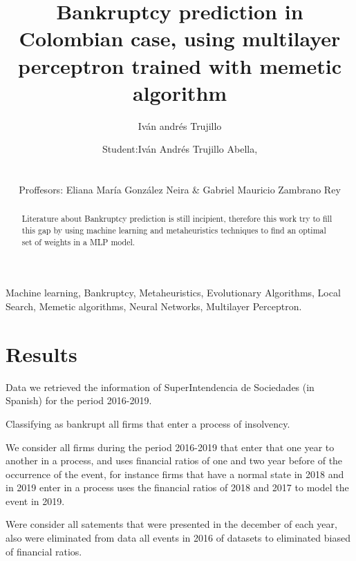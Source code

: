 \documentclass[journal]{IEEEtai}
\begin{document}
\title{Bankruptcy prediction in Colombian case, using multilayer perceptron trained with memetic algorithm} 


\author{ Iván andrés Trujillo }

\author{Student:Iván Andrés Trujillo Abella,\\

\\
\\

Proffesors: Eliana María González Neira \& Gabriel Mauricio Zambrano Rey}
\maketitle

\begin{abstract}
Literature about Bankruptcy prediction is still incipient, therefore this work try to fill this gap by using machine learning  and metaheuristics techniques to find an optimal set of  weights in a MLP model.
\end{abstract}


\begin{IEEEkeywords}
Machine learning, Bankruptcy, Metaheuristics, Evolutionary Algorithms, Local Search, Memetic algorithms, Neural Networks, Multilayer Perceptron.
\end{IEEEkeywords}





\section{Results}


Data we retrieved the information of SuperIntendencia de Sociedades (in Spanish) for the period 2016-2019.

Classifying as bankrupt all firms  that enter a process of insolvency.




We consider all firms during the period 2016-2019 that enter that one year to another in a process, and uses financial ratios of one and two year before of the occurrence of the event, for instance firms that have a normal state in 2018 and in 2019 enter  in a process uses the financial ratios of 2018 and 2017 to model the event in 2019.

Were consider all satements that were presented in the december of each year, also were eliminated from data all events in 2016 of datasets to eliminated biased of financial ratios.
\end{document}
